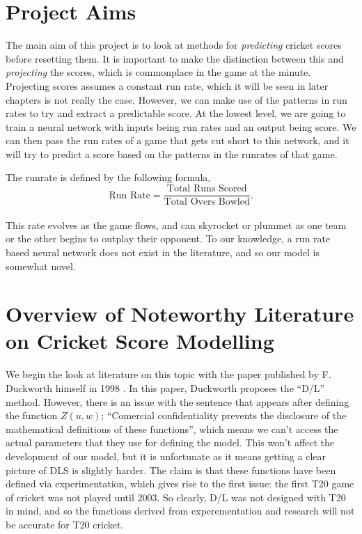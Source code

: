 \section{Project Aims}
The main aim of this project is to look at methods for \textit{predicting} cricket scores before resetting them. It is important to make the distinction between this 
and \textit{projecting} the scores, which is commonplace in the game at the minute. Projecting scores assumes a constant run rate, which it will be seen 
in later chapters is not really the case. However, we can make use of the patterns in run rates to try and extract a predictable score. At the lowest level,
we are going to train a neural network with inputs being run rates and an output being score. We can then pass the run rates of a game that gets cut short 
to this network, and it will try to predict a score based on the patterns in the runrates of that game.

The runrate is defined by the following formula, \\

\[
    \text{Run Rate}  = \frac{\text{Total Runs Scored}}{\text{Total Overs Bowled}}.
\]\\

This rate evolves as the game flows, and can skyrocket or plummet as one team or the other begins to outplay their opponent. To our knowledge, a run rate 
based neural network does not exist in the literature, and so our model is somewhat novel.

\section{Overview of Noteworthy Literature on Cricket Score Modelling}
We begin the look at literature on this topic with the paper published by F. Duckworth himself in 1998 \cite{duckworth}. In this paper, 
Duckworth proposes the ``D/L'' method. However, there is an issue with the sentence that appears after defining the function $Z(u,w)$;
``Comercial confidentiality prevents the disclosure of the mathematical definitions of these functions'', which means we can't access the actual parameters 
that they use for defining the model. This won't affect the development of our model, but it is unfortunate as it means getting a clear picture of DLS is slightly harder.
The claim is that these functions have been defined via experimentation, which gives rise to the first issue: the first T20 game of cricket was not played until 2003. 
So clearly, D/L was not designed with T20 in mind, and so the functions derived from experementation and research will not be accurate for T20 cricket. \\


